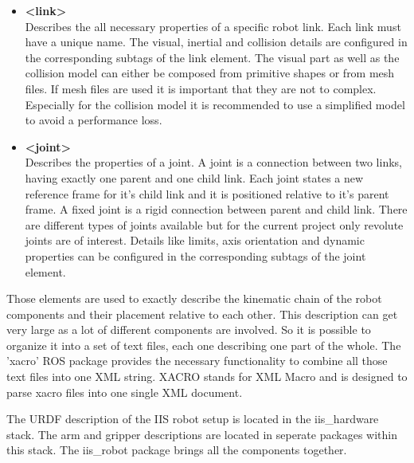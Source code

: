 \begin{itemize}

\item \textbf{<link>} \\
Describes the all necessary properties of a specific robot link. Each link must have a unique name. The visual, inertial and collision details are configured in the corresponding subtags of the link element. The visual part as well as the collision model can either be composed from primitive shapes
or from mesh files. If mesh files are used it is important that they are not to complex. Especially for the collision model it is recommended to use a simplified model to avoid a performance loss.

\item \textbf{<joint>} \\
Describes the properties of a joint. A joint is a connection between two links, having exactly one parent and one child link. Each joint states a new reference frame for it's child link and it is positioned relative to it's parent frame. A fixed joint is a rigid connection between parent and child link. There are different types of joints available but for the current project only revolute joints are of interest. Details like limits, axis orientation and dynamic properties can be configured in the corresponding subtags of the joint element.

\end{itemize}

Those elements are used to exactly describe the kinematic chain of the robot components and their placement relative to each other. This description can get very large as a lot of different components are involved. So it is possible to organize it into a set of text files, each one describing one part of the whole. The 'xacro' ROS package provides the necessary functionality to combine all those text files into one XML string. XACRO stands for XML Macro and is designed to parse xacro files into one single XML document.

The URDF description of the IIS robot setup is located in the iis\_hardware stack. The arm and gripper descriptions are located in seperate packages within this stack. The iis\_robot package brings all the components together.

